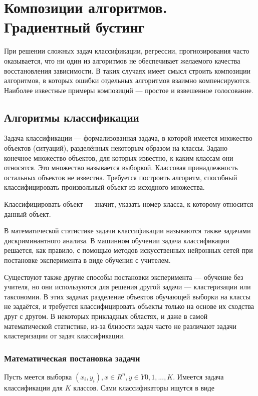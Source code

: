 \section{Композиции алгоритмов. Градиентный бустинг}

При решении сложных задач классификации, регрессии, прогнозирования часто оказывается, что ни один из алгоритмов не обеспечивает желаемого качества восстановления зависимости. В таких случаях имеет смысл строить композиции алгоритмов, в которых ошибки отдельных алгоритмов взаимно компенсируются. Наиболее известные примеры композиций — простое и взвешенное голосование. 

\subsection{Алгоритмы классификации}

Задача классификации — формализованная задача, в которой имеется множество объектов (ситуаций), разделённых некоторым образом на классы. Задано конечное множество объектов, для которых известно, к каким классам они относятся. Это множество называется выборкой. Классовая принадлежность остальных объектов не известна. Требуется построить алгоритм, способный классифицировать произвольный объект из исходного множества.

Классифицировать объект — значит, указать номер класса, к которому относится данный объект.

В математической статистике задачи классификации называются также задачами дискриминантного анализа. В машинном обучении задача классификации решается, как правило, с помощью методов искусственных нейронных сетей при постановке эксперимента в виде обучения с учителем.

Существуют также другие способы постановки эксперимента — обучение без учителя, но они используются для решения другой задачи — кластеризации или таксономии. В этих задачах разделение объектов обучающей выборки на классы не задаётся, и требуется классифицировать объекты только на основе их сходства друг с другом. В некоторых прикладных областях, и даже в самой математической статистике, из-за близости задач часто не различают задачи кластеризации от задач классификации.

\subsubsection{Математическая постановка задачи}

Пусть меется выборка $(x_i,y_i) , x \in R^n , y \in Y{0,1,...,K}$. Имеется задача классификации для $K$ классов. Сами классификаторы ищутся в виде


